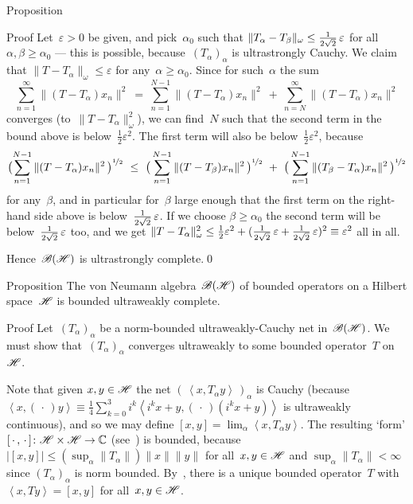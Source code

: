 \documentclass[a]{subfiles}
\begin{document}
\begin{parsec}
\begin{point}[bh-us-complete]{Proposition}
\begin{point}{Proof}
Let~$\varepsilon>0$ be given,
and pick~$\alpha_0$
such that $\|T_\alpha-T_\beta\|_\omega \leq 
\smash{\frac{1}{2\sqrt{2}}}\,\varepsilon$
for all~$\alpha,\beta\geq \alpha_0$
--- this is possible, because~$(T_\alpha)_\alpha$ is ultrastrongly Cauchy.
We claim that $\|T-T_\alpha\|_\omega \leq \varepsilon$
for any~$\alpha\geq \alpha_0$.
Since for such~$\alpha$
the sum
\begin{equation*}
	\sum_{n=1}^\infty \|(T-T_\alpha)x_n\|^2 
	\ = \ 
	\sum_{n=1}^{N-1} \|(T-T_\alpha)x_n\|^2
	\ +\ 
	\sum_{n=N}^\infty
	\|(T-T_\alpha)x_n\|^2
\end{equation*}
converges (to~$\|T-T_\alpha\|_\omega^2$),
we can find~$N$ such that the second term in the bound above
is below~$\frac{1}{2}\varepsilon^2$.
The first term will also be below~$\frac{1}{2}\varepsilon^2$,
because
\begin{equation*}
	\bigl(\sum_{n=1}^{N-1} \|(T - T_\alpha)x_n\|^2\,\bigr)^{\nicefrac{1}{2}}
	\ \leq\ 
\bigl(\,
\sum_{n=1}^{N-1} \|(T-T_{\beta})x_n\|^2
\,\bigr)^{\nicefrac{1}{2}}
\ +\ 
\bigl(\,
\sum_{n=1}^{N-1} \|(T_\beta-T_\alpha)x_n\|^2
\,\bigr)^{\nicefrac{1}{2}}
\end{equation*}
for any~$\beta$,
and in particular for~$\beta$
large enough that the first term on the right-hand side above
is below~$\smash{\frac{1}{2\sqrt{2}}}\,\varepsilon$.
If we choose $\beta\geq \alpha_0$
the second term will be below~$\smash{\frac{1}{2\sqrt{2}}}\,\varepsilon$ too,
and we get $\|T-T_\alpha\|_\omega^2 \leq \frac{1}{2}\varepsilon^2
+ (\smash{\frac{1}{2\sqrt{2}}\,\varepsilon 
+ \frac{1}{2\sqrt{2}}\,\varepsilon})^2
\equiv \varepsilon^2$ 
all in all.

Hence~$\mathscr{B}(\mathscr{H})$ is ultrastrongly complete.\qed
\end{point}

\end{point}
\begin{point}[bh-bounded-uw-complete]{Proposition}%
The von Neumann algebra~$\mathscr{B}(\mathscr{H})$
of bounded operators on a Hilbert space~$\mathscr{H}$
is bounded ultraweakly complete.
\begin{point}{Proof}%
Let~$(T_\alpha)_\alpha$ be a norm-bounded ultraweakly-Cauchy net
in~$\mathscr{B}(\mathscr{H})$.
We must show that~$(T_\alpha)_\alpha$
converges ultraweakly
to some bounded operator~$T$ on~$\mathscr{H}$.

Note that given $x,y\in\mathscr{H}$
the net $(\,\left<x,T_\alpha y\right>\,)_\alpha$
is Cauchy
(because $\left<x,(\,\cdot\,)y\right>
\equiv \frac{1}{4}\sum_{k=0}^3 i^k\left<i^kx+y,(\,\cdot\,)(i^kx+y)\right>$
is ultraweakly continuous),
and so we may define $[x,y] = \lim_\alpha \left<x,T_\alpha y\right>$.
The resulting `form'
$[\,\cdot\,,\,\cdot\,]\colon \mathscr{H}\times\mathscr{H}\to \mathbb{C}$
(see~\sref{chilb-form})
is bounded, 
because~$\left|[x,y]\right| \leq (\sup_\alpha \|T_\alpha\|)\|x\|\|y\|$
for all~$x,y\in\mathscr{H}$
and $\sup_\alpha\|T_\alpha\|<\infty$
since $(T_\alpha)_\alpha$
is norm bounded.
By~,
there is a unique bounded operator~$T$
with $\left<x,Ty\right>=[x,y]$
for all~$x,y\in\mathscr{H}$.


\end{point}
\end{point}
\end{parsec}
\end{document}
